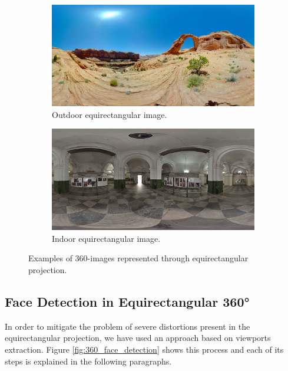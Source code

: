 \begin{figure}[!ht]
\centering
    \begin{subfigure}{0.47\linewidth}
        \centering
        \includegraphics[width=1\textwidth]{img/video360/equi_outdoor.jpg}
        \caption{Outdoor equirectangular image.}
        \label{subfig:out_equi}
    \end{subfigure}\hfill
    \begin{subfigure}{0.47\linewidth}
        \centering
        \includegraphics[width=1\textwidth]{img/video360/equi_indoor.jpg}
        \caption{Indoor equirectangular image.}
        \label{subfig:in_equi}
    \end{subfigure}

\caption{Examples of 360-images represented through equirectangular projection.}
\label{fig:equirectangular_proj}
\end{figure}

\subsection{Face Detection in Equirectangular 360°}
\label{subsec:360_face_detection}

In order to mitigate the problem of severe distortions present in the equirectangular projection, we have used an approach based on viewports extraction. Figure \ref{fig:360_face_detection} shows this process and each of its steps is explained in the following paragraphs.

